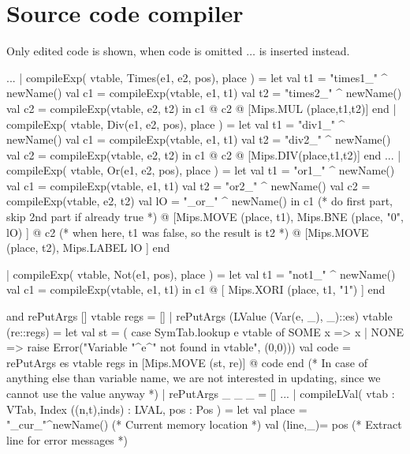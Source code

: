 \documentclass[10pt]{article}
\begin{document}
\section{Source code compiler}
Only edited code is shown, when code is omitted $\ldots$ is inserted instead.
\begin{fancycode}[frame=lines,fontsize=\scriptsize,label=\textit{edited code - SRC/Compiler.sml}]
...
    | compileExp( vtable, Times(e1, e2, pos), place ) =
        let val t1 = "times1_" ^ newName()
            val c1 = compileExp(vtable, e1, t1)
            val t2 = "times2_" ^ newName()
            val c2 = compileExp(vtable, e2, t2)
        in c1 @ c2 @ [Mips.MUL (place,t1,t2)]
        end
    | compileExp( vtable, Div(e1, e2, pos), place ) =
        let val t1 = "div1_" ^ newName()
            val c1 = compileExp(vtable, e1, t1)
            val t2 = "div2_" ^ newName()
            val c2 = compileExp(vtable, e2, t2)
        in c1 @ c2 @ [Mips.DIV(place,t1,t2)]
        end
...
    | compileExp( vtable, Or(e1, e2, pos), place ) =
        let val t1 = "or1_" ^ newName()
            val c1 = compileExp(vtable, e1, t1)
            val t2 = "or2_" ^ newName()
            val c2 = compileExp(vtable, e2, t2)
            val lO = "_or_" ^ newName()
        in c1 (* do first part, skip 2nd part if already true *)
           @ [Mips.MOVE (place, t1), Mips.BNE (place, "0", lO) ]
           @ c2 (* when here, t1 was false, so the result is t2 *)
           @ [Mips.MOVE (place, t2), Mips.LABEL lO ]
        end

    | compileExp( vtable, Not(e1, pos), place ) =
        let val t1 = "not1_" ^ newName()
            val c1 = compileExp(vtable, e1, t1)
        in c1 @ [ Mips.XORI (place, t1, "1") ]
        end

   and rePutArgs [] vtable regs = []
     | rePutArgs (LValue (Var(e, _), _)::es) vtable (re::regs) =
      let
         val st = ( case SymTab.lookup e vtable of
           SOME x => x
         | NONE => raise Error("Variable "^e^" not found in vtable", (0,0)))
          val code = rePutArgs es vtable regs
      in
          [Mips.MOVE (st, re)] @ code
      end
      (* In case of anything else than variable name, we are not interested
         in updating, since we cannot use the value anyway *)
     | rePutArgs _ _ _ = []
...
    | compileLVal( vtab : VTab, Index ((n,t),inds) : LVAL, pos : Pos ) =
        let
            val place = "_cur_"^newName() (* Current memory location *)
            val (line,_)= pos (* Extract line for error messages *)


\end{fancycode}
\end{document}
